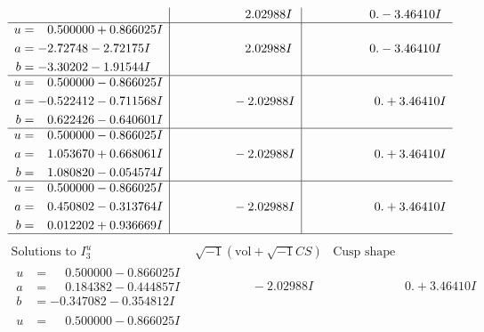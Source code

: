 \documentclass[1p]{elsarticle_modified}
\theoremstyle{definition}
\newcommand{\I}{\sqrt{-1}}
\begin{document}
$$\begin{array}{c|c|c}
 & \phantom{-0.000000 -}2.02988 I & \phantom{-0.000000 } 0. - 3.46410 I \\ \hline\begin{aligned}
u &= \phantom{-}0.500000 + 0.866025 I \\
a &= -2.72748 - 2.72175 I \\
b &= -3.30202 - 1.91544 I\end{aligned}
 & \phantom{-0.000000 -}2.02988 I & \phantom{-0.000000 } 0. - 3.46410 I \\ \hline\begin{aligned}
u &= \phantom{-}0.500000 - 0.866025 I \\
a &= -0.522412 - 0.711568 I \\
b &= \phantom{-}0.622426 - 0.640601 I\end{aligned}
 & \phantom{-0.000000 } -2.02988 I & \phantom{-0.000000 -}0. + 3.46410 I \\ \hline\begin{aligned}
u &= \phantom{-}0.500000 - 0.866025 I \\
a &= \phantom{-}1.053670 + 0.668061 I \\
b &= \phantom{-}1.080820 - 0.054574 I\end{aligned}
 & \phantom{-0.000000 } -2.02988 I & \phantom{-0.000000 -}0. + 3.46410 I \\ \hline\begin{aligned}
u &= \phantom{-}0.500000 - 0.866025 I \\
a &= \phantom{-}0.450802 - 0.313764 I \\
b &= \phantom{-}0.012202 + 0.936669 I\end{aligned}
 & \phantom{-0.000000 } -2.02988 I & \phantom{-0.000000 -}0. + 3.46410 I\\
 \hline 
 \end{array}$$\newpage$$\begin{array}{c|c|c}  
\text{Solutions to }I^u_{3}& \I (\text{vol} + \sqrt{-1}CS) & \text{Cusp shape}\\
 \hline 
\begin{aligned}
u &= \phantom{-}0.500000 - 0.866025 I \\
a &= \phantom{-}0.184382 - 0.444857 I \\
b &= -0.347082 - 0.354812 I\end{aligned}
 & \phantom{-0.000000 } -2.02988 I & \phantom{-0.000000 -}0. + 3.46410 I \\ \hline\begin{aligned}
u &= \phantom{-}0.500000 - 0.866025 I \\

\end{aligned}
\end{array}$$
\end{document}
